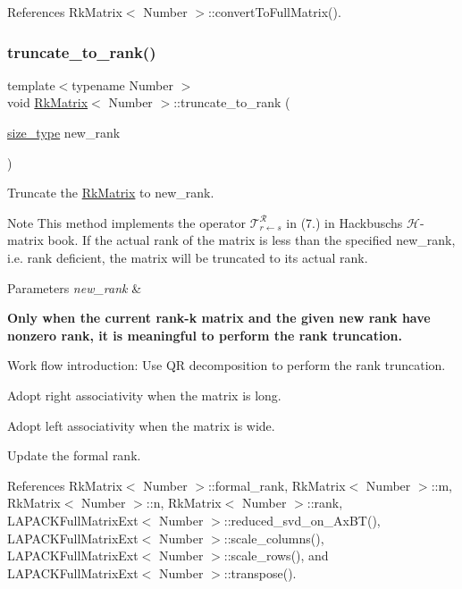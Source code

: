 References Rk\+Matrix$<$ Number $>$\+::convert\+To\+Full\+Matrix().

\mbox{\label{classRkMatrix_a555e0c3184b8411db1350c8fe1e875a0}} 
\subsubsection{\texorpdfstring{truncate\+\_\+to\+\_\+rank()}{truncate\_to\_rank()}}
{\footnotesize\ttfamily template$<$typename Number $>$ \\
void \hyperlink{classRkMatrix}{Rk\+Matrix}$<$ Number $>$\+::truncate\+\_\+to\+\_\+rank (\begin{DoxyParamCaption}\item[{\hyperlink{classRkMatrix_add060bfc3a4cc77f858c3d6dd58cadd5}{size\+\_\+type}}]{new\+\_\+rank }\end{DoxyParamCaption})}

Truncate the \hyperlink{classRkMatrix}{Rk\+Matrix} to {\ttfamily new\+\_\+rank}.


\begin{DoxyDescription}
\item[Note ]This method implements the operator $\mathcal{T}_{r \leftarrow s}^{\mathcal{R}}$ in (7.) in Hackbusch\textquotesingle{}s $\mathcal{H}$-\/matrix book. If the actual rank of the matrix is less than the specified {\ttfamily new\+\_\+rank}, i.\+e. rank deficient, the matrix will be truncated to its actual rank. 
\end{DoxyDescription}
\begin{DoxyParams}{Parameters}
{\em new\+\_\+rank} & \\
\hline
\end{DoxyParams}
{\bfseries Only when the current rank-\/k matrix and the given new rank have nonzero rank, it is meaningful to perform the rank truncation.}

Work flow introduction\+: Use QR decomposition to perform the rank truncation.

Adopt right associativity when the matrix is long.

Adopt left associativity when the matrix is wide.

Update the formal rank.

References Rk\+Matrix$<$ Number $>$\+::formal\+\_\+rank, Rk\+Matrix$<$ Number $>$\+::m, Rk\+Matrix$<$ Number $>$\+::n, Rk\+Matrix$<$ Number $>$\+::rank, L\+A\+P\+A\+C\+K\+Full\+Matrix\+Ext$<$ Number $>$\+::reduced\+\_\+svd\+\_\+on\+\_\+\+Ax\+B\+T(), L\+A\+P\+A\+C\+K\+Full\+Matrix\+Ext$<$ Number $>$\+::scale\+\_\+columns(), L\+A\+P\+A\+C\+K\+Full\+Matrix\+Ext$<$ Number $>$\+::scale\+\_\+rows(), and L\+A\+P\+A\+C\+K\+Full\+Matrix\+Ext$<$ Number $>$\+::transpose().



